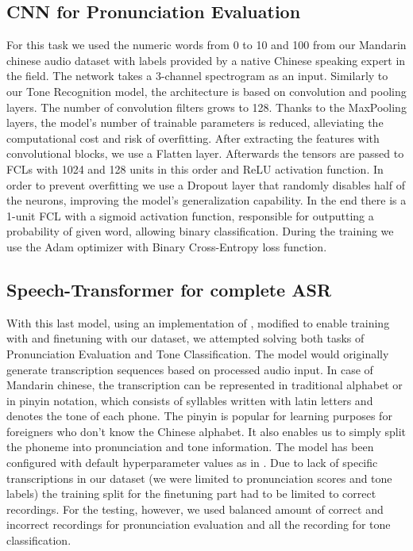 \documentclass[conference]{IEEEtran}
\begin{document}
\subsection{CNN for Pronunciation Evaluation}
For this task we used the numeric words from 0 to 10 and 100 from our Mandarin chinese audio dataset with labels provided by a native Chinese speaking expert in the field. The network takes a 3-channel spectrogram as an input. Similarly to our Tone Recognition model, the architecture is based on convolution and pooling layers.
The number of convolution filters grows to 128. Thanks to the MaxPooling layers, the model's number of trainable parameters is reduced, alleviating the computational cost and risk of overfitting. After extracting the features with convolutional blocks, we use a Flatten layer.
Afterwards the tensors are passed to FCLs with 1024 and 128 units in this order and ReLU activation function. In order to prevent overfitting we use a Dropout layer that randomly disables half of the neurons, improving the model's generalization capability.
In the end there is a 1-unit FCL with a sigmoid activation function, responsible for outputting a probability of given word, allowing binary classification. During the training we use the Adam optimizer \cite{Kingma2014AdamAM} with Binary Cross-Entropy loss function.

\subsection{Speech-Transformer for complete ASR}
With this last model, using an implementation of \cite{vaswani2023attentionneed,8462506}, modified to enable training with \cite{shi2021aishell3multispeakermandarintts} and finetuning with our dataset, we attempted solving both tasks of Pronunciation Evaluation and Tone Classification.
The model would originally generate transcription sequences based on processed audio input. In case of Mandarin chinese, the transcription can be represented in traditional alphabet or in pinyin notation, which consists of syllables written with latin letters and denotes the tone of each phone.
The pinyin is popular for learning purposes for foreigners who don't know the Chinese alphabet. It also enables us to simply split the phoneme into pronunciation and tone information.
The model has been configured with default hyperparameter values as in \cite{8462506}. Due to lack of specific transcriptions in our dataset (we were limited to pronunciation scores and tone labels) the training split for the finetuning part had to be limited to correct recordings. %
For the testing, however, we used balanced amount of correct and incorrect recordings for pronunciation evaluation and all the recording for tone classification.
\end{document}
